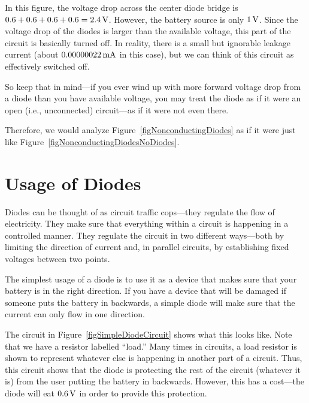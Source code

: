 
In this figure, the voltage drop across the center diode bridge is $0.6 + 0.6 + 0.6 + 0.6 = 2.4\,\si{\volt}$.
However, the battery source is only $1\,\si{\volt}$.
Since the voltage drop of the diodes is larger than the available voltage, this part of the circuit is basically turned off.
In reality, there is a small but ignorable leakage current (about $0.00000022\,\si{\milli\ampere}$ in this case), but we can think of this circuit as effectively switched off.

So keep that in mind---if you ever wind up with more forward voltage drop from a diode than you have available voltage, you may treat the diode as if it were an open (i.e., unconnected) circuit---as if it were not even there.

Therefore, we would analyze Figure~\ref{figNonconductingDiodes} as if it were just like Figure~\ref{figNonconductingDiodesNoDiodes}.


\section{Usage of Diodes}

Diodes can be thought of as circuit traffic cops---they regulate the flow of electricity.
They make sure that everything within a circuit is happening in a controlled manner.
They regulate the circuit in two different ways---both by limiting the direction of current and, in parallel circuits, by establishing fixed voltages between two points.

The simplest usage of a diode is to use it as a device that makes sure that your battery is in the right direction.
If you have a device that will be damaged if someone puts the battery in backwards, a simple diode will make sure that the current can only flow in one direction.


The circuit in Figure~\ref{figSimpleDiodeCircuit} shows what this looks like.
Note that we have a resistor labelled ``load.''  
Many times in circuits, a load resistor is shown to represent whatever else is happening in another part of a circuit.
Thus, this circuit shows that the diode is protecting the rest of the circuit (whatever it is) from the user putting the battery in backwards.
However, this has a cost---the diode will eat $0.6\,\si{\volt}$ in order to provide this protection.

